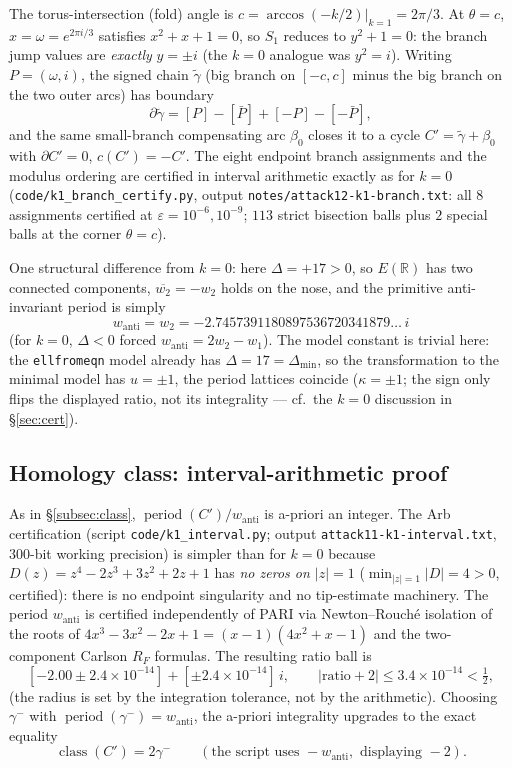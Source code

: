 \documentclass[11pt]{amsart}
\theoremstyle{definition}
\theoremstyle{remark}
\newcommand{\R}{\mathbb{R}}
\DeclareMathOperator{\period}{period}
\DeclareMathOperator{\class}{class}
\begin{document}
The torus-intersection (fold) angle is
$c=\arccos(-k/2)\big|_{k=1}=2\pi/3$. At $\theta=c$, $x=\omega=e^{2\pi i/3}$
satisfies $x^2+x+1=0$, so $S_1$ reduces to $y^2+1=0$: the branch jump values
are \emph{exactly} $y=\pm i$ (the $k=0$ analogue was $y^2=i$). Writing
$P=(\omega,i)$, the signed chain $\tilde\gamma$ (big branch on $[-c,c]$ minus
the big branch on the two outer arcs) has boundary
\[
  \partial\tilde\gamma=[P]-[\bar P]+[-P]-[-\bar P],
\]
and the same
small-branch compensating arc $\beta_0$ closes it to a cycle
$C'=\tilde\gamma+\beta_0$ with $\partial C'=0$, $c(C')=-C'$.
The eight endpoint branch assignments and the modulus ordering are certified
in interval arithmetic exactly as for $k=0$
(\texttt{code/k1\_branch\_certify.py}, output
\texttt{notes/attack12-k1-branch.txt}: all $8$ assignments certified at
$\varepsilon=10^{-6},10^{-9}$; $113$ strict bisection balls plus $2$ special
balls at the corner $\theta=c$).

One structural difference from $k=0$: here $\Delta=+17>0$, so $E(\R)$ has
two connected components, $\overline{w_2}=-w_2$ holds on the nose, and the
primitive anti-invariant period is simply
\[
  w_{\mathrm{anti}}=w_2=-2.7457391180897536720341879\ldots\,i
\]
(for $k=0$, $\Delta<0$ forced $w_{\mathrm{anti}}=2w_2-w_1$).
The model constant is trivial here: the \texttt{ellfromeqn} model already has
$\Delta=17=\Delta_{\min}$, so the transformation to the minimal model has
$u=\pm1$, the period lattices coincide ($\kappa=\pm1$; the sign only flips
the displayed ratio, not its integrality --- cf.\ the $k=0$ discussion in
\S\ref{sec:cert}).

\subsection{Homology class: interval-arithmetic proof}

As in \S\ref{subsec:class}, $\period(C')/w_{\mathrm{anti}}$ is a-priori an
integer. The Arb certification (script \texttt{code/k1\_interval.py};
output \texttt{attack11-k1-interval.txt}, $300$-bit working precision)
is simpler than for $k=0$ because
$D(z)=z^4-2z^3+3z^2+2z+1$ has \emph{no zeros on $|z|=1$}
($\min_{|z|=1}|D|=4>0$, certified): there is no endpoint singularity and no
tip-estimate machinery. The period $w_{\mathrm{anti}}$ is certified
independently of PARI via Newton--Rouch\'e isolation of the roots of
$4x^3-3x^2-2x+1=(x-1)(4x^2+x-1)$ and the two-component Carlson $R_F$
formulas. The resulting ratio ball is
\[
  [-2.00\pm2.4\times10^{-14}]+[\pm2.4\times10^{-14}]\,i,
  \qquad |\mathrm{ratio}+2|\le3.4\times10^{-14}<\tfrac12,
\]
(the radius is set by the integration tolerance, not by the arithmetic).
Choosing $\gamma^-$ with $\period(\gamma^-)=w_{\mathrm{anti}}$, the a-priori
integrality upgrades to the exact equality
\[
  \class(C')=2\gamma^-
  \qquad(\text{the script uses }-w_{\mathrm{anti}},\text{ displaying }-2).
\]
\end{document}
